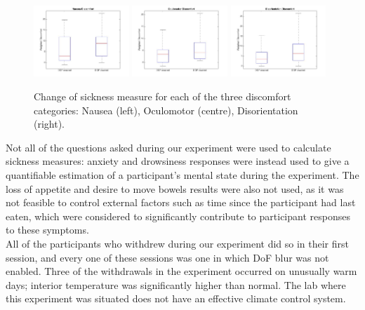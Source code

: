 \begin{figure}[t]
        \centering
            \includegraphics[width=0.32\textwidth]{images/nausea.jpg}
            \includegraphics[width=0.32\textwidth]{images/oculomotor.jpg}
            \includegraphics[width=0.32\textwidth]{images/disorientation.jpg}
            \caption{Change of sickness measure for each of the three discomfort categories: Nausea (left), Oculomotor (centre), Disorientation (right).}
            \label{fig:categorySickness}
\end{figure}


Not all of the questions asked during our experiment were used to calculate sickness measures: anxiety and drowsiness responses were instead used to give a quantifiable estimation of a participant's mental state during the experiment. The loss of appetite and desire to move bowels results were also not used, as it was not feasible to control external factors such as time since the participant had last eaten, which were considered to significantly contribute to participant responses to these symptoms. \\

All of the participants who withdrew during our experiment did so in their first session, and every one of these sessions was one in which DoF blur was not enabled. Three of the withdrawals in the experiment occurred on unusually warm days; interior temperature was significantly higher than normal. The lab where this experiment was situated does not have an effective climate control system.\\

